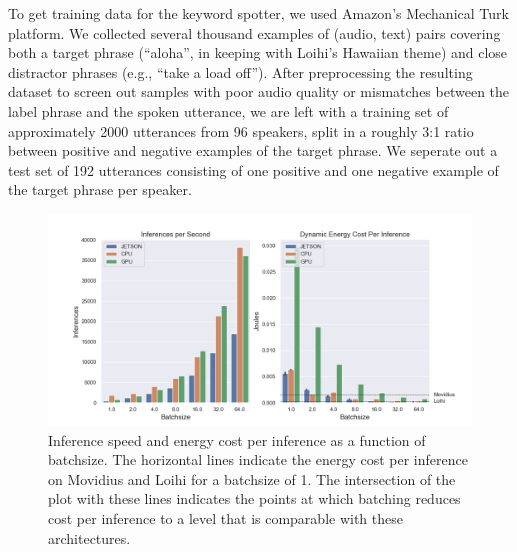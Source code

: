 \documentclass{article}
\begin{document}
To get training data for the keyword spotter, we used Amazon's Mechanical Turk platform. We collected several thousand examples of (audio, text) pairs covering both a target phrase (``aloha'', in keeping with Loihi's Hawaiian theme) and close distractor phrases (e.g., ``take a load off''). After preprocessing the resulting dataset to screen out samples with poor audio quality or mismatches between the label phrase and the spoken utterance, we are left with a training set of approximately 2000 utterances from 96 speakers, split in a roughly 3:1 ratio between positive and negative examples of the target phrase. We seperate out a test set of 192 utterances consisting of one positive and one negative example of the target phrase per speaker. 
 
\begin{figure}[ht!]
\centering
    \includegraphics[width=6.5in]{./figures/batch_comparison.png}
    \caption{Inference speed and energy cost per inference as a function of batchsize. The horizontal lines indicate the energy cost per inference on Movidius and Loihi for a batchsize of 1. The intersection of the plot with these lines indicates the points at which batching reduces cost per inference to a level that is comparable with these architectures.}
\label{batchsize_fig}
\end{figure}
\end{document}
